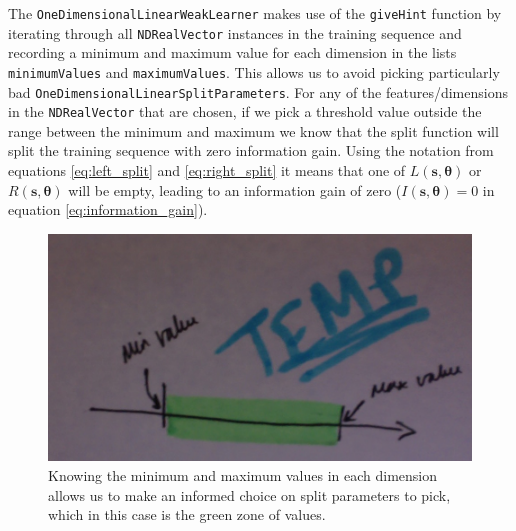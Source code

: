 \documentclass[12pt,twoside,notitlepage]{report}
\newcommand{\vc}[1]{\mathbf{#1}}
\begin{document}
                The \texttt{OneDimensionalLinearWeakLearner} makes use of the \texttt{giveHint} function by iterating through 
                all \texttt{NDRealVector} instances in the training sequence and recording a minimum and maximum value 
                for each dimension in the lists \texttt{minimumValues} and \texttt{maximumValues}. This  
                allows us to avoid picking particularly bad \texttt{OneDimensionalLinearSplitParameters}. 
                For any of the features/dimensions in the \texttt{NDRealVector} 
                that are chosen, if we pick a threshold value outside the range between the minimum and maximum we know that 
                the split function will split the training sequence with zero information gain. Using the notation from 
                equations \ref{eq:left_split} and \ref{eq:right_split} it means that one of $L(\vc{s},\vc{\theta})$ or 
                $R(\vc{s},\vc{\theta})$ will be empty, leading to an information gain of zero ($I(\vc{s},\vc{\theta}) = 0$ 
                in equation \ref{eq:information_gain}).

                \begin{figure}[H]
                  \centering
                  \includegraphics[scale=0.25]{one_dimensional_weak_learner_optimisation}
                  \caption{Knowing the minimum and maximum values in each dimension allows us to make an informed 
                  choice on split parameters to pick, which in this case is the green zone of values.}
                  \label{fig:split_parameter_choice_optimisation}
                \end{figure}
\end{document}
